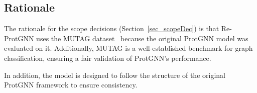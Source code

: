 \documentclass[12pt]{article}
\newcounter{nfrnum} %
\begin{document}



  


  



\subsection{Rationale}

The rationale for the scope decisions (Section~\ref{sec_scopeDec}) is that Re-ProtGNN uses the MUTAG dataset~\citep{debnath1991structure} because the original ProtGNN model was evaluated on it. Additionally, MUTAG is a well-established benchmark for graph classification, ensuring a fair validation of ProtGNN's performance.

In addition, the model is designed to follow the structure of the original ProtGNN framework to ensure consistency.
\end{document}
